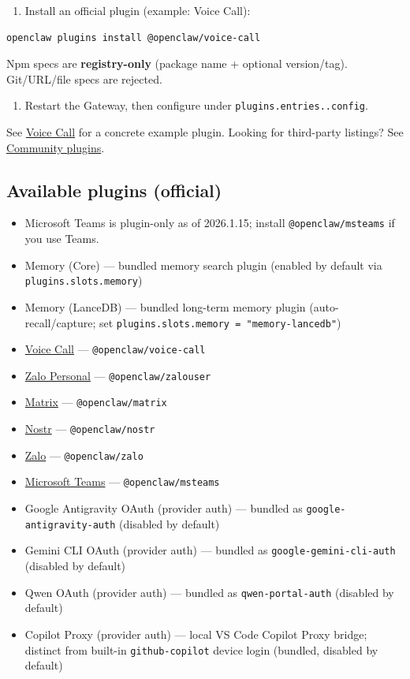 \begin{enumerate}
  \item Install an official plugin (example: Voice Call):
\end{enumerate}


\begin{lstlisting}[language=bash]
openclaw plugins install @openclaw/voice-call
\end{lstlisting}


Npm specs are \textbf{registry-only} (package name + optional version/tag). Git/URL/file
specs are rejected.

\begin{enumerate}
  \item Restart the Gateway, then configure under \texttt{plugins.entries..config}.
\end{enumerate}


See \href{/plugins/voice-call}{Voice Call} for a concrete example plugin.
Looking for third-party listings? See \href{/plugins/community}{Community plugins}.

\subsection{Available plugins (official)}


\begin{itemize}
  \item Microsoft Teams is plugin-only as of 2026.1.15; install \texttt{@openclaw/msteams} if you use Teams.
  \item Memory (Core) — bundled memory search plugin (enabled by default via \texttt{plugins.slots.memory})
  \item Memory (LanceDB) — bundled long-term memory plugin (auto-recall/capture; set \texttt{plugins.slots.memory = "memory-lancedb"})
  \item \href{/plugins/voice-call}{Voice Call} — \texttt{@openclaw/voice-call}
  \item \href{/plugins/zalouser}{Zalo Personal} — \texttt{@openclaw/zalouser}
  \item \href{/channels/matrix}{Matrix} — \texttt{@openclaw/matrix}
  \item \href{/channels/nostr}{Nostr} — \texttt{@openclaw/nostr}
  \item \href{/channels/zalo}{Zalo} — \texttt{@openclaw/zalo}
  \item \href{/channels/msteams}{Microsoft Teams} — \texttt{@openclaw/msteams}
  \item Google Antigravity OAuth (provider auth) — bundled as \texttt{google-antigravity-auth} (disabled by default)
  \item Gemini CLI OAuth (provider auth) — bundled as \texttt{google-gemini-cli-auth} (disabled by default)
  \item Qwen OAuth (provider auth) — bundled as \texttt{qwen-portal-auth} (disabled by default)
  \item Copilot Proxy (provider auth) — local VS Code Copilot Proxy bridge; distinct from built-in \texttt{github-copilot} device login (bundled, disabled by default)
\end{itemize}


